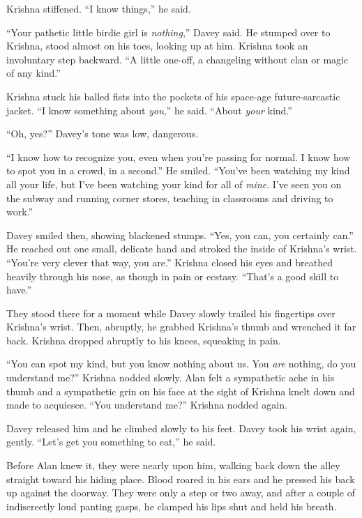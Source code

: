 Krishna stiffened.  ``I know things,'' he said.

``Your pathetic little birdie girl is \textit{nothing},'' Davey said. 
He stumped over to Krishna, stood almost on his toes, looking up at
him.  Krishna took an involuntary step backward.  ``A little one-off,
a changeling without clan or magic of any kind.''

Krishna stuck his balled fists into the pockets of his space-age
future-sarcastic jacket.  ``I know something about \textit{you},'' he
said.  ``About \textit{your} kind.''

``Oh, yes?'' Davey's tone was low, dangerous.

``I know how to recognize you, even when you're passing for normal.  I
know how to spot you in a crowd, in a second.'' He smiled.  ``You've
been watching my kind all your life, but I've been watching your kind
for all of \textit{mine}.  I've seen you on the subway and running
corner stores, teaching in classrooms and driving to work.''

Davey smiled then, showing blackened stumps.  ``Yes, you can, you
certainly can.'' He reached out one small, delicate hand and stroked
the inside of Krishna's wrist.  ``You're very clever that way, you
are.'' Krishna closed his eyes and breathed heavily through his nose,
as though in pain or ecstasy.  ``That's a good skill to have.''

They stood there for a moment while Davey slowly trailed his
fingertips over Krishna's wrist.  Then, abruptly, he grabbed Krishna's
thumb and wrenched it far back.  Krishna dropped abruptly to his
knees, squeaking in pain.

``You can spot my kind, but you know nothing about us.  You
\textit{are} nothing, do you understand me?'' Krishna nodded slowly. 
Alan felt a sympathetic ache in his thumb and a sympathetic grin on
his face at the sight of Krishna knelt down and made to acquiesce. 
``You understand me?'' Krishna nodded again.

Davey released him and he climbed slowly to his feet.  Davey took his
wrist again, gently.  ``Let's get you something to eat,'' he said.

Before Alan knew it, they were nearly upon him, walking back down the
alley straight toward his hiding place.  Blood roared in his ears and
he pressed his back up against the doorway.  They were only a step or
two away, and after a couple of indiscreetly loud panting gasps, he
clamped his lips shut and held his breath.

